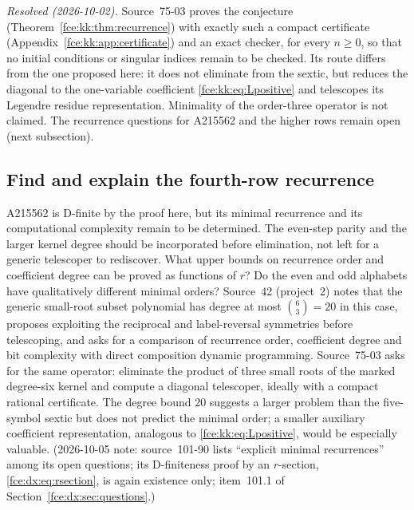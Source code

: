 \documentclass[11pt,a4paper]{article}
\numberwithin{equation}{section}
\theoremstyle{definition}\newtheorem{definition}[theorem]{Definition}
\theoremstyle{remark}\newtheorem{remark}[theorem]{Remark}
\begin{document}
\emph{Resolved (2026-10-02).} Source~75-03 proves the conjecture
(Theorem~\ref{fce:kk:thm:recurrence}) with exactly such a compact
certificate (Appendix~\ref{fce:kk:app:certificate}) and an exact checker,
for every $n\ge0$, so that no initial conditions or singular indices remain
to be checked. Its route differs from the one proposed here: it does not
eliminate from the sextic, but reduces the diagonal to the one-variable
coefficient \eqref{fce:kk:eq:Lpositive} and telescopes its Legendre
residue representation. Minimality of the order-three operator is not
claimed. The recurrence questions for A215562 and the higher rows remain
open (next subsection).

\subsection{Find and explain the fourth-row recurrence}
A215562 is D-finite by the proof here, but its minimal recurrence and its
computational complexity remain to be determined. The even-step parity
and the larger kernel degree should be incorporated before elimination,
not left for a generic telescoper to rediscover. What upper bounds on
recurrence order and coefficient degree can be proved as functions of $r$?
Do the even and odd alphabets have qualitatively different minimal orders?
Source~42 (project~2) notes that the generic small-root subset polynomial
has degree at most $\binom63=20$ in this case, proposes exploiting the
reciprocal and label-reversal symmetries before telescoping, and asks for a
comparison of recurrence order, coefficient degree and bit complexity with
direct composition dynamic programming. Source~75-03 asks for the same
operator: eliminate the product of three small roots of the marked
degree-six kernel and compute a diagonal telescoper, ideally with a compact
rational certificate. The degree bound $20$ suggests a larger problem than
the five-symbol sextic but does not predict the minimal order; a smaller
auxiliary coefficient representation, analogous to
\eqref{fce:kk:eq:Lpositive}, would be especially valuable. (2026-10-05 note: source~101-90 lists ``explicit minimal recurrences'' among its open
questions; its D-finiteness proof by an $r$-section,
\eqref{fce:dx:eq:rsection}, is again existence only; item~101.1 of
Section~\ref{fce:dx:sec:questions}.)
\end{document}
